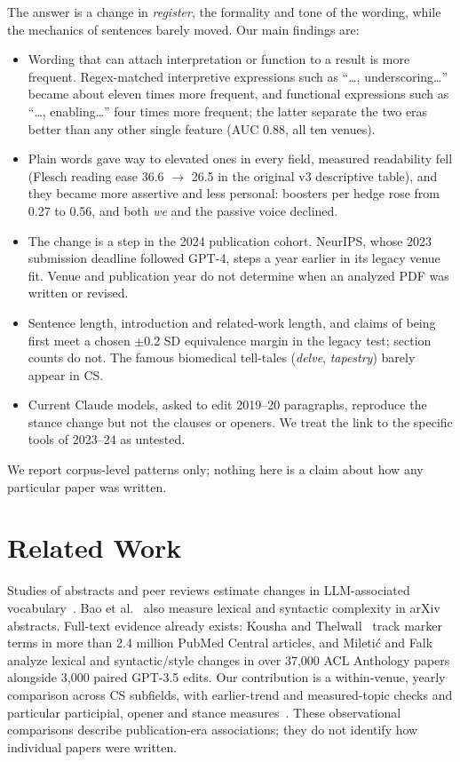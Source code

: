 \documentclass[10pt,twocolumn]{article}
\begin{document}
The answer is a change in \emph{register}, the formality and tone of the wording, while the mechanics of sentences barely moved. Our main findings are:
\begin{itemize}
\item Wording that can attach interpretation or function to a result is more frequent. Regex-matched interpretive expressions such as ``\ldots, underscoring\ldots'' became about eleven times more frequent, and functional expressions such as ``\ldots, enabling\ldots'' four times more frequent; the latter separate the two eras better than any other single feature (AUC 0.88, all ten venues).
\item Plain words gave way to elevated ones in every field, measured readability fell (Flesch reading ease 36.6 $\to$ 26.5 in the original v3 descriptive table), and they became more assertive and less personal: boosters per hedge rose from 0.27 to 0.56, and both \textit{we} and the passive voice declined.
\item The change is a step in the 2024 publication cohort. NeurIPS, whose 2023 submission deadline followed GPT-4, steps a year earlier in its legacy venue fit. Venue and publication year do not determine when an analyzed PDF was written or revised.
\item Sentence length, introduction and related-work length, and claims of being first meet a chosen $\pm$0.2 SD equivalence margin in the legacy test; section counts do not. The famous biomedical tell-tales (\textit{delve}, \textit{tapestry}) barely appear in CS.
\item Current Claude models, asked to edit 2019--20 paragraphs, reproduce the stance change but not the clauses or openers. We treat the link to the specific tools of 2023--24 as untested.
\end{itemize}
We report corpus-level patterns only; nothing here is a claim about how any particular paper was written.

\section{Related Work}

Studies of abstracts and peer reviews estimate changes in LLM-associated vocabulary~\citep{kobak2024delving,liang2024mapping,liang2024monitoring,geng2024chatgpt}. Bao et al.~\citep{bao2025linguistic} also measure lexical and syntactic complexity in arXiv abstracts. Full-text evidence already exists: Kousha and Thelwall~\citep{kousha2026language} track marker terms in more than 2.4 million PubMed Central articles, and Mileti\'c and Falk~\citep{miletic2026communication} analyze lexical and syntactic/style changes in over 37,000 ACL Anthology papers alongside 3,000 paired GPT-3.5 edits. Our contribution is a within-venue, yearly comparison across CS subfields, with earlier-trend and measured-topic checks and particular participial, opener and stance measures~\citep{hyland1998hedging}. These observational comparisons describe publication-era associations; they do not identify how individual papers were written.
\end{document}
